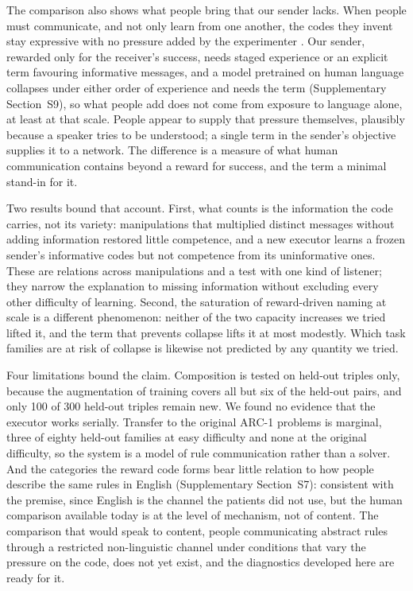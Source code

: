 \documentclass{nature}
\begin{document}
The comparison also shows what people bring that our sender lacks. When people must communicate, and not only
learn from one another, the codes they invent stay expressive with no pressure added by the experimenter
\cite{galantucci2005,fay2010,kirby2015}. Our sender, rewarded only for the receiver's success, needs staged
experience or an explicit term favouring informative messages, and a model pretrained on human language collapses
under either order of experience and needs the term (Supplementary Section~S9), so what people add does not come
from exposure to language alone, at least at that scale. People appear to supply that pressure themselves, plausibly because a speaker tries to be understood; a
single term in the sender's objective supplies it to a network. The difference is a measure of what human
communication contains beyond a reward for success, and the term a minimal stand-in for it.

Two results bound that account. First, what counts is the information the code carries, not its variety:
manipulations that multiplied distinct messages without adding information restored little competence, and a new
executor learns a frozen sender's informative codes but not competence from its uninformative ones. These are relations across manipulations and a test with one kind
of listener; they narrow the explanation to missing information without excluding every other difficulty of
learning. Second, the saturation of reward-driven naming at scale is a different phenomenon: neither of the two
capacity increases we tried lifted it, and the term that prevents collapse lifts it at most modestly. Which task
families are at risk of collapse is likewise not predicted by any quantity we tried.

Four limitations bound the claim. Composition is tested on held-out triples only, because the augmentation of
training covers all but six of the held-out pairs, and only 100 of 300 held-out triples remain new. We found no
evidence that the executor works serially. Transfer to the original ARC-1 problems is marginal, three of eighty
held-out families at easy difficulty and none at the original difficulty, so the system is a model of rule
communication rather than a solver. And the categories the reward code forms bear little relation to how people
describe the same rules in English \cite{acquaviva2022} (Supplementary Section~S7): consistent with the premise,
since English is the channel the patients did not use, but the human comparison available today is at the level of
mechanism, not of content. The comparison that
would speak to content, people communicating abstract rules through a restricted non-linguistic channel under conditions
that vary the pressure on the code, does not yet exist, and the diagnostics developed here are ready for it.
\end{document}
